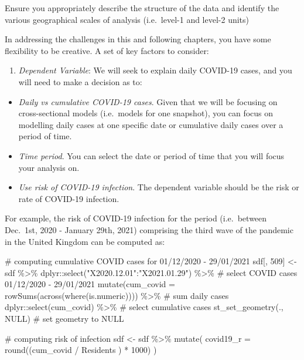 \documentclass[
  letterpaper,
  krantz2]{style/krantz}
\newenvironment{Shaded}{\begin{snugshade}}{\end{snugshade}}
\newcommand{\AttributeTok}[1]{\textcolor[rgb]{0.40,0.45,0.13}{#1}}
\newcommand{\CommentTok}[1]{\textcolor[rgb]{0.37,0.37,0.37}{#1}}
\newcommand{\ConstantTok}[1]{\textcolor[rgb]{0.56,0.35,0.01}{#1}}
\newcommand{\DecValTok}[1]{\textcolor[rgb]{0.68,0.00,0.00}{#1}}
\newcommand{\FunctionTok}[1]{\textcolor[rgb]{0.28,0.35,0.67}{#1}}
\newcommand{\NormalTok}[1]{\textcolor[rgb]{0.00,0.23,0.31}{#1}}
\newcommand{\OtherTok}[1]{\textcolor[rgb]{0.00,0.23,0.31}{#1}}
\newcommand{\SpecialCharTok}[1]{\textcolor[rgb]{0.37,0.37,0.37}{#1}}
\newcommand{\StringTok}[1]{\textcolor[rgb]{0.13,0.47,0.30}{#1}}
\providecommand{\tightlist}{%
  \setlength{\itemsep}{0pt}\setlength{\parskip}{0pt}}\usepackage{longtable,booktabs,array}
\begin{document}
Ensure you appropriately describe the structure of the data and identify
the various geographical scales of analysis (i.e.~level-1 and level-2
units)

In addressing the challenges in this and following chapters, you have
some flexibility to be creative. A set of key factors to consider:

\begin{enumerate}
\def\labelenumi{\arabic{enumi}.}
\tightlist
\item
  \emph{Dependent Variable}: We will seek to explain daily COVID-19
  cases, and you will need to make a decision as to:
\end{enumerate}

\begin{itemize}
\item
  \emph{Daily vs cumulative COVID-19 cases}. Given that we will be
  focusing on cross-sectional models (i.e.~models for one snapshot), you
  can focus on modelling daily cases at one specific date or cumulative
  daily cases over a period of time.
\item
  \emph{Time period}. You can select the date or period of time that you
  will focus your analysis on.
\item
  \emph{Use risk of COVID-19 infection}. The dependent variable should
  be the risk or rate of COVID-19 infection.
\end{itemize}

For example, the risk of COVID-19 infection for the period (i.e.~between
Dec.~1st, 2020 - January 29th, 2021) comprising the third wave of the
pandemic in the United Kingdom can be computed as:

\begin{Shaded}
\begin{Highlighting}[]
\CommentTok{\# computing cumulative COVID cases for  01/12/2020 {-} 29/01/2021}
\NormalTok{sdf[, }\DecValTok{509}\NormalTok{] }\OtherTok{\textless{}{-}}\NormalTok{ sdf }\SpecialCharTok{\%\textgreater{}\%}\NormalTok{ dplyr}\SpecialCharTok{::}\FunctionTok{select}\NormalTok{(}\StringTok{"X2020.12.01"}\SpecialCharTok{:}\StringTok{"X2021.01.29"}\NormalTok{) }\SpecialCharTok{\%\textgreater{}\%} \CommentTok{\# select COVID cases 01/12/2020 {-} 29/01/2021}
  \FunctionTok{mutate}\NormalTok{(}\AttributeTok{cum\_covid =} \FunctionTok{rowSums}\NormalTok{(}\FunctionTok{across}\NormalTok{(}\FunctionTok{where}\NormalTok{(is.numeric)))) }\SpecialCharTok{\%\textgreater{}\%} \CommentTok{\# sum daily cases}
\NormalTok{  dplyr}\SpecialCharTok{::}\FunctionTok{select}\NormalTok{(cum\_covid) }\SpecialCharTok{\%\textgreater{}\%} \CommentTok{\# select cumulative cases}
   \FunctionTok{st\_set\_geometry}\NormalTok{(., }\ConstantTok{NULL}\NormalTok{) }\CommentTok{\# set geometry to NULL}

\CommentTok{\# computing risk of infection}
\NormalTok{sdf }\OtherTok{\textless{}{-}}\NormalTok{ sdf }\SpecialCharTok{\%\textgreater{}\%}  \FunctionTok{mutate}\NormalTok{(}
  \AttributeTok{covid19\_r =} \FunctionTok{round}\NormalTok{((cum\_covid }\SpecialCharTok{/}\NormalTok{ Residents ) }\SpecialCharTok{*} \DecValTok{1000}\NormalTok{) }
\NormalTok{  )}
\end{Highlighting}
\end{Shaded}
\end{document}
